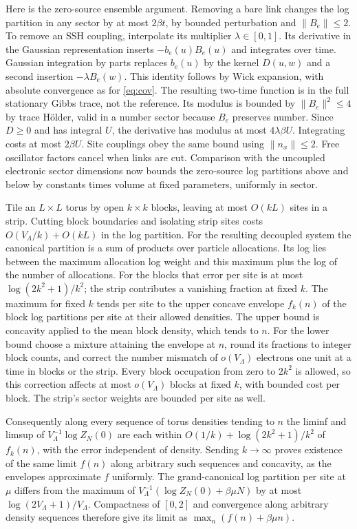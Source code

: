 \documentclass[11pt]{article}
\begin{document}
Here is the zero-source ensemble argument. Removing a bare link changes the log partition in any sector by at most $2\beta t$, by bounded perturbation and $\|B_e\|\le2$. To remove an SSH coupling, interpolate its multiplier $\lambda\in[0,1]$. Its derivative in the Gaussian representation inserts $-b_e(u)B_e(u)$ and integrates over time. Gaussian integration by parts replaces $b_e(u)$ by the kernel $D(u,w)$ and a second insertion $-\lambda B_e(w)$. This identity follows by Wick expansion, with absolute convergence as for \eqref{eq:cov}. The resulting two-time function is in the full stationary Gibbs trace, not the reference. Its modulus is bounded by $\|B_e\|^2\le4$ by trace H\"older, valid in a number sector because $B_e$ preserves number. Since $D\ge0$ and has integral $U$, the derivative has modulus at most $4\lambda\beta U$. Integrating costs at most $2\beta U$. Site couplings obey the same bound using $\|n_x\|\le2$. Free oscillator factors cancel when links are cut. Comparison with the uncoupled electronic sector dimensions now bounds the zero-source log partitions above and below by constants times volume at fixed parameters, uniformly in sector.

Tile an $L\times L$ torus by open $k\times k$ blocks, leaving at most $O(kL)$ sites in a strip. Cutting block boundaries and isolating strip sites costs $O(V_\Lambda/k)+O(kL)$ in the log partition. For the resulting decoupled system the canonical partition is a sum of products over particle allocations. Its log lies between the maximum allocation log weight and this maximum plus the log of the number of allocations. For the blocks that error per site is at most $\log(2k^2+1)/k^2$; the strip contributes a vanishing fraction at fixed $k$. The maximum for fixed $k$ tends per site to the upper concave envelope $f_k(n)$ of the block log partitions per site at their allowed densities. The upper bound is concavity applied to the mean block density, which tends to $n$. For the lower bound choose a mixture attaining the envelope at $n$, round its fractions to integer block counts, and correct the number mismatch of $o(V_\Lambda)$ electrons one unit at a time in blocks or the strip. Every block occupation from zero to $2k^2$ is allowed, so this correction affects at most $o(V_\Lambda)$ blocks at fixed $k$, with bounded cost per block. The strip's sector weights are bounded per site as well.

Consequently along every sequence of torus densities tending to $n$ the liminf and limsup of $V_\Lambda^{-1}\log Z_N(0)$ are each within $O(1/k)+\log(2k^2+1)/k^2$ of $f_k(n)$, with the error independent of density. Sending $k\to\infty$ proves existence of the same limit $f(n)$ along arbitrary such sequences and concavity, as the envelopes approximate $f$ uniformly. The grand-canonical log partition per site at $\mu$ differs from the maximum of $V_\Lambda^{-1}(\log Z_N(0)+\beta\mu N)$ by at most $\log(2V_\Lambda+1)/V_\Lambda$. Compactness of $[0,2]$ and convergence along arbitrary density sequences therefore give its limit as $\max_n(f(n)+\beta\mu n)$.
\end{document}
